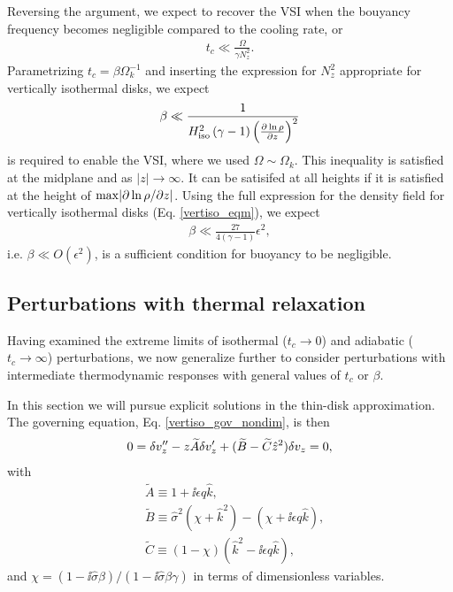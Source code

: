 Reversing the argument, we expect to recover the VSI when the bouyancy
frequency becomes negligible compared to the cooling rate, or 
\begin{align}
  t_c \ll \frac{\Omega}{\gamma N_z^2}. 
\end{align} 
Parametrizing $t_c = \beta\Omega_k^{-1}$ and inserting the expression
for $N_z^2$ appropriate for vertically isothermal disks, we expect
\begin{align}
  \beta \ll
  \frac{1}{H^2_\mathrm{iso}\left(\gamma-1\right)\left(\frac{\partial\ln\rho}{\partial
          z}\right)^2} 
\end{align}
is required to enable the VSI, where we used $\Omega\sim\Omega_k$.  
This inequality is satisfied at the
midplane and as $|z|\to\infty$. It can be satisifed at all heights if
it is satisfied at the height of $\mathrm{max}|\partial\ln\rho/\partial z|$. 
Using the full expression for the density field for vertically isothermal
disks (Eq. \ref{vertiso_eqm}), we expect 
\begin{align}
  \beta \ll \frac{27}{4(\gamma-1)}\epsilon^2,
\end{align}
i.e. $\beta\ll O(\epsilon^2)$, is a sufficient condition for
buoyancy to be negligible.  


\subsection{Perturbations with thermal relaxation}\label{analytic_relax}
Having examined the extreme limits of isothermal ($t_c\to0$) and
adiabatic ($t_c\to\infty$) perturbations, we now generalize further to consider
perturbations with intermediate thermodynamic responses with general
values of $t_c$ or $\beta$.  

In this section we will pursue explicit solutions in the thin-disk
approximation. The governing equation, Eq. \ref{vertiso_gov_nondim}, is
then 
\begin{align}
  0 = \delta v_z^{\prime\prime} - z \widetilde{A}\delta v_z^\prime +
  (\widetilde{B} - \widetilde{C}\hat{z}^2)\delta v_z = 0,\label{nearly_iso_explicit}
\end{align}
with
\begin{align}
  &\widetilde{A} \equiv 1 + \ii \epsilon q \hat{k},\\
  &\widetilde{B} \equiv \hat{\sigma}^2\left(\chi + \hat{k}^2\right) -
  \left(\chi + \ii \epsilon q \hat{k}\right),\\
  &\widetilde{C} \equiv \left(1-\chi\right)\left(\hat{k}^2 - \ii
      \epsilon q\hat{k}\right), 
\end{align}
and $\chi =
\left(1-\ii\hat{\sigma}\beta\right)/\left(1-\ii\hat{\sigma}\beta\gamma\right)
$ in terms of dimensionless variables.  


